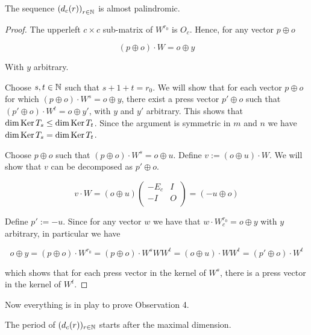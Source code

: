 \begin{theorem}[Observation 5]\label{theorem:palindromic}
  The sequence $\left(d_{c}(r)\right)_{r\in\mathbb{N}}$
  is almost palindromic.
\end{theorem}

\begin{proof}
  The upperleft $c\times c$ sub-matrix of $W^{r_{0}}$ is $O_{c}$. Hence, for any vector $p\oplus o$

  \[
    (p\oplus o)\cdot W = o\oplus y
  \]

  With $y$ arbitrary.

  Choose $s,t\in\mathbb{N}$ such that $s + 1 + t = r_{0}$. We will show that for each vector $p\oplus o$ for which $(p\oplus o)\cdot W^s = o\oplus y$, there exist a press vector $p'\oplus o$ such that $(p'\oplus o)\cdot W^t = o\oplus y'$, with $y$ and $y'$ arbitrary.
  This shows that $\dim\operatorname{Ker} T_{s} \leq \dim\operatorname{Ker} T_{t}$. Since the argument is symmetric in $m$ and $n$ we have $\dim\operatorname{Ker} T_{s} = \dim\operatorname{Ker} T_{t}$.

	Choose $p\oplus o$ such that $(p\oplus o)\cdot W^{s} = o\oplus u$. Define $v := (o\oplus u)\cdot W$. We will show that $v$ can be decomposed as $p'\oplus o$.

  \[
    v\cdot W = (o\oplus u)\left(
    \begin{array}{cc}
      -E_{c} & I \\
      -I    & O \\
    \end{array}
    \right)
    =(-u\oplus o)
  \]
  
  Define $p' := -u$. Since for any vector $w$ we have that $w\cdot W_{c}^{r_0} = o\oplus y$ with $y$ arbitrary, in particular we have

  \[
  o\oplus y = (p\oplus o)\cdot W^{r_{0}} = (p\oplus o)\cdot W^{s} W W^{t} = (o\oplus u)\cdot W W^{t} = (p'\oplus o)\cdot W^{t}
  \]

  which shows that for each press vector in the kernel of $W^{s}$, there is a press vector in the kernel of $W^{t}$.
\end{proof}

Now everything is in play to prove Observation 4.

\begin{theorem}[Observation 4]
	The period of $(d_{c}(r))_{r\in\mathbb{N}}$ starts after the maximal dimension.
\end{theorem}

